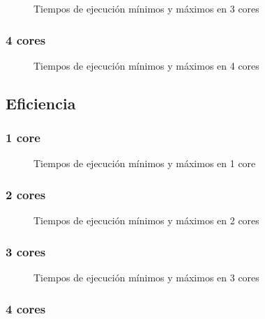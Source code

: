 \documentclass[a4paper,10pt,twoside]{article}
\begin{document}
\begin{figure}[H]
	\centering
	
	\caption{Tiempos de ejecución mínimos y máximos en 3 cores}
\end{figure}


\subsubsection{4 cores}

\begin{figure}[H]
	\centering
	
	\caption{Tiempos de ejecución mínimos y máximos en 4 cores}
\end{figure}


\subsection{Eficiencia}


\subsubsection{1 core}

\begin{figure}[H]
	\centering
	
	\caption{Tiempos de ejecución mínimos y máximos en 1 core}
\end{figure}


\subsubsection{2 cores}

\begin{figure}[H]
	\centering
	
	\caption{Tiempos de ejecución mínimos y máximos en 2 cores}
\end{figure}


\subsubsection{3 cores}

\begin{figure}[H]
	\centering
	
	\caption{Tiempos de ejecución mínimos y máximos en 3 cores}
\end{figure}


\subsubsection{4 cores}
\end{document}
